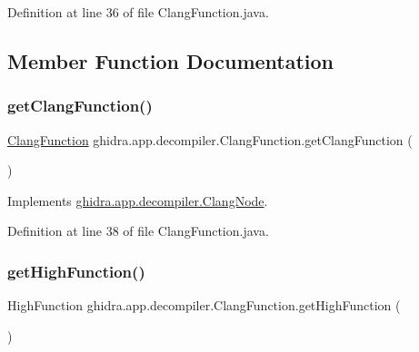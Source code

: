 Definition at line 36 of file Clang\+Function.\+java.



\subsection{Member Function Documentation}
\mbox{\label{classghidra_1_1app_1_1decompiler_1_1_clang_function_aa327efcad2a0070511834a9edb1fc270}} 
\subsubsection{\texorpdfstring{getClangFunction()}{getClangFunction()}}
{\footnotesize\ttfamily \mbox{\hyperlink{classghidra_1_1app_1_1decompiler_1_1_clang_function}{Clang\+Function}} ghidra.\+app.\+decompiler.\+Clang\+Function.\+get\+Clang\+Function (\begin{DoxyParamCaption}{ }\end{DoxyParamCaption})\hspace{0.3cm}{\ttfamily [inline]}}



Implements \mbox{\hyperlink{interfaceghidra_1_1app_1_1decompiler_1_1_clang_node_a715989d3fa33942a85517fae04a70ac0}{ghidra.\+app.\+decompiler.\+Clang\+Node}}.



Definition at line 38 of file Clang\+Function.\+java.

\mbox{\label{classghidra_1_1app_1_1decompiler_1_1_clang_function_af1f2a880d7e39b1df3a611b95ff62910}} 
\subsubsection{\texorpdfstring{getHighFunction()}{getHighFunction()}}
{\footnotesize\ttfamily High\+Function ghidra.\+app.\+decompiler.\+Clang\+Function.\+get\+High\+Function (\begin{DoxyParamCaption}{ }\end{DoxyParamCaption})\hspace{0.3cm}{\ttfamily [inline]}}



